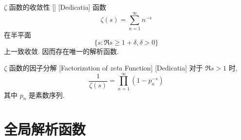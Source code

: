         \begin{thm}
            {\(\zeta\) 函数的收敛性}
            []
            [Dedicatia]
            函数
            \[\zeta(s)=\sum_{n=1}^{\infty}n^{-s}\]
            在半平面
            \[\{s:\Re s\geq 1+\delta, \delta>0\}\]
            上一致收敛. 因而存在唯一的解析函数.
        \end{thm}

        \begin{thm}
            {\(\zeta\) 函数的因子分解}
            [Factorization of \(zeta\) Function]
            [Dedicatia]
            对于 \(\Re s>1\) 时, 
            \[\frac{1}{\zeta(s)}=\prod_{n=1}^{\infty}(1-p_n^{-s})\]
            其中 \(p_n\) 是素数序列.
        \end{thm}

\section{全局解析函数}